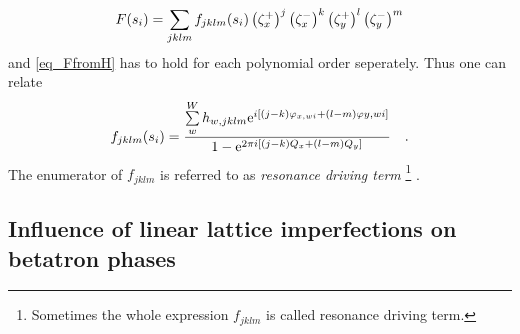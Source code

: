 %
\begin{equation}
    F(s_i) = \sum\limits_{jklm} f_{jklm}(s_i) \left(\zeta_x^+\right)^{j} \left(\zeta_x^-\right)^{k} \left(\zeta_y^+\right)^{l} \left(\zeta_y^-\right)^{m}
\end{equation}
%
and \eqref{eq_FfromH} has to hold for each polynomial order seperately. Thus one can relate 
%
\begin{equation}
    f_{jklm}(s_i)=\frac{
        \sum\limits_w^W h_{w,jklm} \text{e}^{i \left[ (j-k) \varphi_{x,wi} + (l-m)\varphi{y,wi} \right]}
    }{
        1-\text{e}^{2\pi i [(j-k)Q_x+(l-m)Q_y]}
    }
    \quad .
    \label{eq_fijkl_from_h}
\end{equation}
%
The enumerator of $f_{jklm}$ is referred to as \emph{resonance driving term}%
\footnote{%
  Sometimes the whole expression $f_{jklm}$ is called resonance driving term.
}%
.

\subsection{Influence of linear lattice imperfections on betatron phases}
\label{sec:deriv}
\label{sec_phase_beating}

